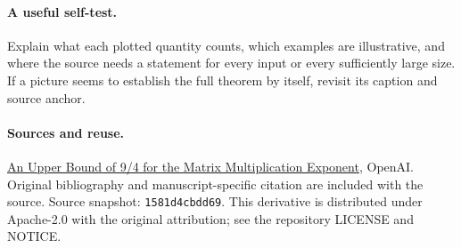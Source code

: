 \documentclass[11pt]{article}
\begin{document}
\paragraph{A useful self-test.} Explain what each plotted quantity counts, which examples are illustrative, and where the source needs a statement for every input or every sufficiently large size. If a picture seems to establish the full theorem by itself, revisit its caption and source anchor.\paragraph{Sources and reuse.}\href{https://github.com/openai/math/tree/1581d4cbdd69a0faf34b2089614fe2a814316a6a/preprints/Matrix-Multiplication-Nine-Fourths-October-2-2026}{An Upper Bound of 9/4 for the Matrix Multiplication Exponent}, OpenAI. Original bibliography and manuscript-specific citation are included with the source. Source snapshot: \texttt{1581d4cbdd69}. This derivative is distributed under Apache-2.0 with the original attribution; see the repository LICENSE and NOTICE.
\end{document}
